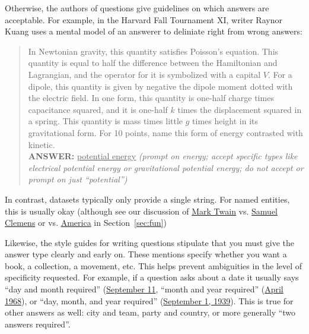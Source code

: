 Otherwise, the authors of questions give guidelines on which answers are acceptable.  
For example, in the Harvard Fall Tournament XI, writer Raynor Kuang uses a mental model of an answerer to deliniate right from wrong answers:
\begin{quote}
     In Newtonian gravity, this quantity satisfies Poisson's equation. This quantity is equal to half the difference between the Hamiltonian and Lagrangian, and the operator for it is symbolized with a capital $V$. For a dipole, this quantity is given by negative the dipole moment dotted with the electric field. In one form, this quantity is one-half charge times capacitance squared, and it is one-half $k$ times the displacement squared in a spring. This quantity is mass times little $g$ times height in its gravitational form. For 10 points, name this form of energy contrasted with kinetic.\\
    {\bf ANSWER:} \underline{potential energy} \textit{(prompt on energy; accept specific types like electrical potential energy or gravitational potential energy; do not accept or prompt on just ``potential'')}
\end{quote}
In contrast, \qa{} datasets typically only provide a single string.  For named entities, this is usually okay (although see our discussion of \underline{Mark Twain} vs. \underline{Samuel Clemens} or \underline{} vs. \underline{America} in Section~\ref{sec:fun})

Likewise, the style guides for writing questions stipulate that you
must give the answer type clearly and early on.
These mentions specify whether you want a book, a collection, a movement, etc.  This helps
prevent ambiguities in the level of specificity requested.  
For example, if a question asks about a date it usually says ``day and month required'' (\underline{September 11}, ``month and year required'' (\underline{April 1968}), or ``day, month, and year required'' (\underline{September 1, 1939}).
This is true for other answers as well: city and team, party and country, or more generally ``two answers required''.

